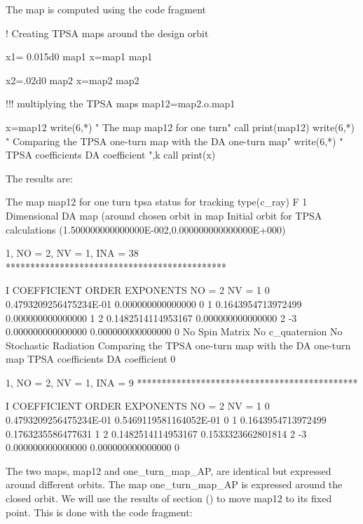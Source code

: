 \documentclass{hitec}     %
\begin{document}
{{ The map is computed using the code fragment
 
 \renewcommand{\codefont}{\footnotesize}
\begin{code}
!  Creating TPSA maps around the design orbit 

x1= 0.015d0
map1%
x=map1%
map1%

x2=.02d0
map2%
x=map2%
map2%

!!! multiplying the TPSA maps
 map12=map2.o.map1
  
 
x=map12%
 write(6,*)  "    The map map12 for one turn"
 call print(map12)
 write(6,*)  "    Comparing the TPSA one-turn map with the DA one-turn map"
 write(6,*)  "    TPSA coefficients      DA coefficient ",k
 call print(x)
\end{code}
 \renewcommand{\codefont}{\small}

The results are: 

\begin{code}
     The map map12 for one turn
  tpsa status for tracking type(c_ray)  F
           1  Dimensional DA map (around chosen orbit in map%
 Initial orbit for TPSA calculations
 (1.500000000000000E-002,0.000000000000000E+000)

          1, NO =    2, NV =    1, INA =   38
 *********************************************

    I  COEFFICIENT          ORDER   EXPONENTS
      NO =     2      NV =     1
   0  0.4793209256475234E-01   0.000000000000000       0
   1  0.1643954713972499       0.000000000000000       1
   2  0.1482514114953167       0.000000000000000       2
    -3   0.000000000000000       0.000000000000000       0
  No Spin Matrix
  No c_quaternion
 No Stochastic Radiation
     Comparing the TPSA one-turn map with the DA one-turn map
     TPSA coefficients      DA coefficient            0

          1, NO =    2, NV =    1, INA =    9
 *********************************************

    I  COEFFICIENT          ORDER   EXPONENTS
      NO =     2      NV =     1
   0  0.4793209256475234E-01  0.5469119581164052E-01   0
   1  0.1643954713972499      0.1763235586477631       1
   2  0.1482514114953167      0.1533323662801814       2
    -3   0.000000000000000       0.000000000000000       0
 \end{code}

The two maps, map12 and one_turn_map_AP, are identical but expressed around different orbits.  The map one_turn_map_AP is expressed around the closed orbit. We will use the results of section () to move map12 to its fixed point. This is done with the code fragment:


}}
\end{document}
